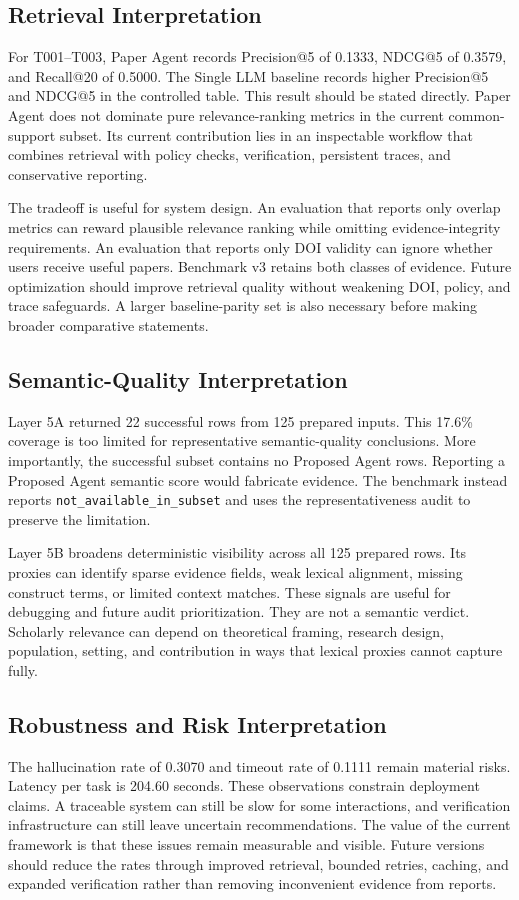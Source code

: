 \documentclass[10pt,twocolumn]{article}
\begin{document}
\subsection{Retrieval Interpretation}
For T001--T003, Paper Agent records Precision@5 of 0.1333, NDCG@5 of 0.3579, and Recall@20 of 0.5000. The Single LLM baseline records higher Precision@5 and NDCG@5 in the controlled table. This result should be stated directly. Paper Agent does not dominate pure relevance-ranking metrics in the current common-support subset. Its current contribution lies in an inspectable workflow that combines retrieval with policy checks, verification, persistent traces, and conservative reporting.

The tradeoff is useful for system design. An evaluation that reports only overlap metrics can reward plausible relevance ranking while omitting evidence-integrity requirements. An evaluation that reports only DOI validity can ignore whether users receive useful papers. Benchmark v3 retains both classes of evidence. Future optimization should improve retrieval quality without weakening DOI, policy, and trace safeguards. A larger baseline-parity set is also necessary before making broader comparative statements.

\subsection{Semantic-Quality Interpretation}
Layer 5A returned 22 successful rows from 125 prepared inputs. This 17.6\% coverage is too limited for representative semantic-quality conclusions. More importantly, the successful subset contains no Proposed Agent rows. Reporting a Proposed Agent semantic score would fabricate evidence. The benchmark instead reports \texttt{not\_available\_in\_subset} and uses the representativeness audit to preserve the limitation.

Layer 5B broadens deterministic visibility across all 125 prepared rows. Its proxies can identify sparse evidence fields, weak lexical alignment, missing construct terms, or limited context matches. These signals are useful for debugging and future audit prioritization. They are not a semantic verdict. Scholarly relevance can depend on theoretical framing, research design, population, setting, and contribution in ways that lexical proxies cannot capture fully.

\subsection{Robustness and Risk Interpretation}
The hallucination rate of 0.3070 and timeout rate of 0.1111 remain material risks. Latency per task is 204.60 seconds. These observations constrain deployment claims. A traceable system can still be slow for some interactions, and verification infrastructure can still leave uncertain recommendations. The value of the current framework is that these issues remain measurable and visible. Future versions should reduce the rates through improved retrieval, bounded retries, caching, and expanded verification rather than removing inconvenient evidence from reports.
\end{document}
